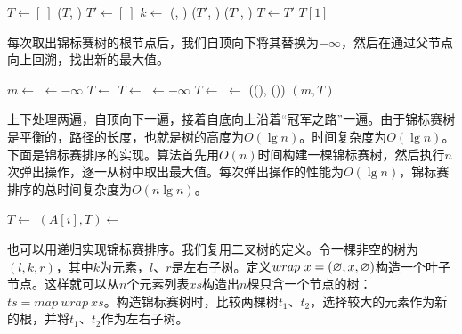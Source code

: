 \documentclass[b5paper]{ctexart}
\begin{document}
\begin{algorithmic}[1]
  \State $T \gets [\ ]$
    \State {}($T$, )
  \EndFor
    \State $T' \gets [\ ]$
      \State $k \gets$ (, )
      \State {}($T'$, )
    \EndFor
      \State {}($T'$, )
    \EndIf
    \State $T \gets T'$
  \EndWhile
  \State \Return $T[1]$
\EndFunction
\end{algorithmic}

每次取出锦标赛树的根节点后，我们自顶向下将其替换为$-\infty$，然后在通过父节点向上回溯，找出新的最大值。

\begin{algorithmic}[1]
  \State $m \gets$ 
  \State {} $\gets -\infty$
    
      \State $T \gets$ 
    \Else
      \State $T \gets$ 
    \EndIf
    \State {} $\gets -\infty$
  \EndWhile
   
    \State $T \gets$ 
    \State {} $\gets$ ((), ())
  \EndWhile
  \State \Return $(m, T)$ 
\EndFunction
\end{algorithmic}

上下处理两遍，自顶向下一遍，接着自底向上沿着“冠军之路”一遍。由于锦标赛树是平衡的，路径的长度，也就是树的高度为$O(\lg n)$。时间复杂度为$O(\lg n)$。下面是锦标赛排序的实现。算法首先用$O(n)$时间构建一棵锦标赛树，然后执行$n$次弹出操作，逐一从树中取出最大值。每次弹出操作的性能为$O(\lg n)$，锦标赛排序的总时间复杂度为$O(n \lg n)$。

\begin{algorithmic}[1]
  \State $T \gets$ 
    \State $(A[i], T) \gets$ 
  \EndFor
\EndProcedure
\end{algorithmic}

也可以用递归实现锦标赛排序。我们复用二叉树的定义。令一棵非空的树为$(l, k, r)$，其中$k$为元素，$l$、$r$是左右子树。定义$wrap\ x = (\varnothing, x, \varnothing)$构造一个叶子节点。这样就可以从$n$个元素列表$xs$构造出$n$棵只含一个节点的树：$ts = map\ wrap\ xs$。构造锦标赛树时，比较两棵树$t_1$、$t_2$，选择较大的元素作为新的根，并将$t_1$、$t_2$作为左右子树。
\end{document}
